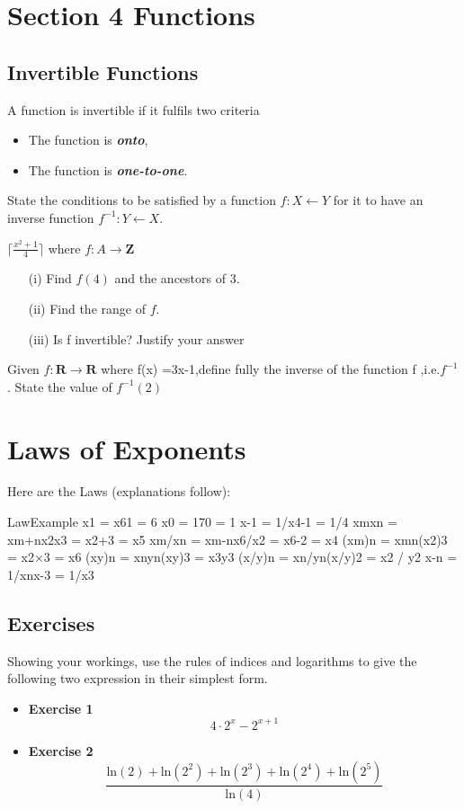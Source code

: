 \section{Section 4 Functions}

\subsection{Invertible Functions}
A function is invertible if it fulfils two criteria
\begin{itemize}
\item The function is \textbf{\textit{onto}},
\item The function is \textbf{\textit{one-to-one}}.
\end{itemize}

State the conditions to be satisfied by a function
$f : X \leftarrow Y$ for it to have an inverse function
$f^{-1} : Y \leftarrow X$.

$\lceil \frac{x^2+1}{4} \rceil$
where $f : A \rightarrow \textbf{Z}$
\begin{itemize}
\item[(i)] Find $f(4)$ and the ancestors of 3.
\item[(ii)] Find the range of $f$.
\item[(iii)] Is f invertible? Justify your answer
\end{itemize}

Given $f : \textbf{R} \rightarrow \textbf{R}$ where f(x) =3x-1,define fully
the inverse of the function f ,i.e.$f^{-1}$. 
State the value of $f^{-1}(2)$



\section{Laws of Exponents}
Here are the Laws (explanations follow):

LawExample
x1 = x61 = 6
x0 = 170 = 1
x-1 = 1/x4-1 = 1/4
xmxn = xm+nx2x3 = x2+3 = x5
xm/xn = xm-nx6/x2 = x6-2 = x4
(xm)n = xmn(x2)3 = x2×3 = x6
(xy)n = xnyn(xy)3 = x3y3
(x/y)n = xn/yn(x/y)2 = x2 / y2
x-n = 1/xnx-3 = 1/x3

\subsection{Exercises}

Showing your workings, use the rules of indices and logarithms to give the following two expression in their simplest form.
\bigskip
\begin{itemize}
\item \textbf{Exercise 1}
\[ 4 \cdot 2^x - 2^{x+1} \]
\item \textbf{Exercise 2}
\[  \frac{\mbox{ln}(2) + \mbox{ln}(2^2) + \mbox{ln}(2^3)  + \mbox{ln}(2^4) + \mbox{ln}(2^5)  }  {\mbox{ln}(4)}  \]
\end{itemize}

